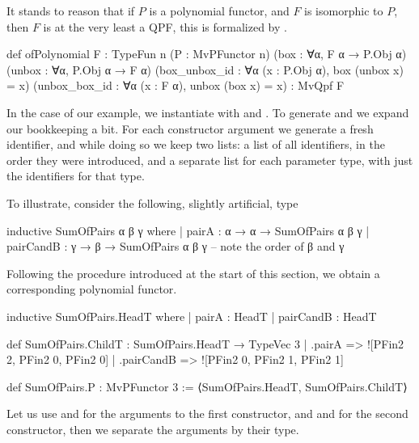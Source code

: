 It stands to reason that if $P$ is a polynomial functor, and $F$ is isomorphic to $P$, then $F$ is at
the very least a QPF, this is formalized by .

\begin{leancode}
    def ofPolynomial {F : TypeFun n} 
                     (P : MvPFunctor n) 
                     (box    : ∀{α}, F α → P.Obj α) 
                     (unbox  : ∀{α}, P.Obj α → F α) 
                     (box_unbox_id : ∀{α} (x : P.Obj α), box (unbox x) = x)
                     (unbox_box_id : ∀{α} (x : F α), unbox (box x) = x)
                  : MvQpf F
\end{leancode}

In the case of our  example, we instantiate  with 
 and .
To generate  and  we expand our bookkeeping a bit. For each constructor argument
we generate a fresh identifier, and while doing so we keep two lists: a list of all identifiers, in 
the order they were introduced, and a separate list for each parameter type, with just the identifiers for that type.

To illustrate, consider the following, slightly artificial, type
\begin{leancode}
  inductive SumOfPairs α β γ where
    | pairA     : α → α → SumOfPairs α β γ 
    | pairCandB : γ → β → SumOfPairs α β γ   -- note the order of β and γ
\end{leancode}

Following the procedure introduced at the start of this section, we obtain a corresponding polynomial functor.
\begin{leancode}
  inductive SumOfPairs.HeadT where
    | pairA     : HeadT
    | pairCandB : HeadT

  def SumOfPairs.ChildT : SumOfPairs.HeadT → TypeVec 3
    | .pairA      => ![PFin2 2, PFin2 0, PFin2 0]
    | .pairCandB  => ![PFin2 0, PFin2 1, PFin2 1]

  def SumOfPairs.P : MvPFunctor 3 :=
    ⟨SumOfPairs.HeadT, SumOfPairs.ChildT⟩
\end{leancode}

Let us use  and  for the arguments to the first constructor, and  and 
for the second constructor, then we separate the arguments by their type.

